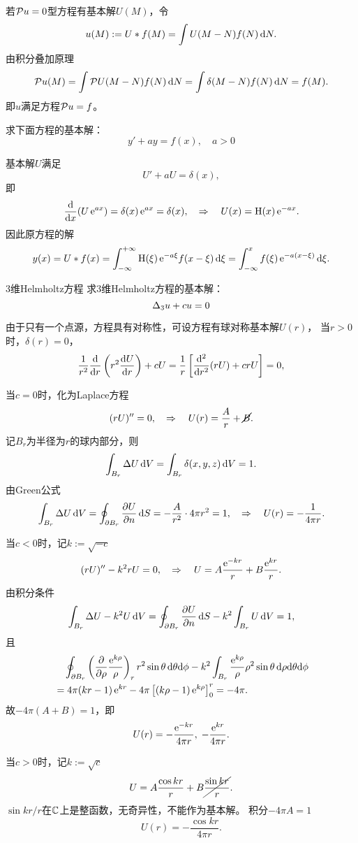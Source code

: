 若$\mathcal P u=0$型方程有基本解$U(M)$，令
\begin{align}
	u(M):=U\ast f(M)=\int U(M-N)f(N)\mathop{}\!\mathrm{d} N.
\end{align}
由积分叠加原理
\[
	\mathcal P u(M)=\int\mathcal P U(M-N)f(N)\mathop{}\!\mathrm{d} N=\int\delta(M-N)f(N)\mathop{}\!\mathrm{d} N=f(M).
\]
即$u$满足方程$\mathcal P u=f$。
\begin{example}{}{}
	求下面方程的基本解：
	\[
		y'+ay=f(x),\quad a>0
	\]
	
	基本解$U$满足
	\[
		U'+aU=\delta(x),
	\]
	即
	\[
		\dd x(U\e{ax})=\vd(x)\e{ax}=\delta(x),\thus U(x)=\Heaviside(x)\e{-ax}.
	\]
	因此原方程的解
	\[
		y(x)=U\ast f(x)=\int_{-\infty}^{+\infty}\operatorname{H}(\xi)\mathop{}\!\mathrm{e}^{-a\xi}f(x-\xi)\mathop{}\!\mathrm{d}\xi=\int_{-\infty}^xf(\xi)\mathop{}\!\mathrm{e}^{-a(x-\xi)}\mathop{}\!\mathrm{d}\xi.
	\]
\end{example}
\begin{example}{3维Helmholtz方程}{}
	求3维Helmholtz方程的基本解：
	\[
		\Delta_3 u+cu=0
	\]
	
	由于只有一个点源，方程具有对称性，可设方程有球对称基本解$U(r)$，
	当$r>0$时，$\delta(r)=0$，
	\[
		\frac1{r^2}\dd r\kh{r^2\dv Ur}+cU=\frac1r\fkh{\dd[2]r(rU)+crU}=0,
	\]
	
	当$c=0$时，化为Laplace方程
	\[
		(rU)''=0,\quad\Rightarrow\quad U(r)=\frac Ar+\cancel{B}.
	\]
	记$B_r$为半径为$r$的球内部分，则
	\[
		\int_{B_r}\Delta U\mathop{}\!\mathrm{d} V=\int_{B_r}\delta(x,y,z)\mathop{}\!\mathrm{d} V=1.
	\]
	由Green公式
	\[
		\int_{B_r}\Delta U\mathop{}\!\mathrm{d} V=\oint_{\partial B_r}\frac{\partial^{\;\!\!}U}{\partial n^{\;\!\!}}\mathop{}\!\mathrm{d} S=-\frac A{r^2}\cdot 4\pi r^2=1,\quad\Rightarrow\quad U(r)=-\frac1{4\pi r}.
	\]
	
	当$c<0$时，记$k:=\sqrt{-c}$
	\[
		(rU)''-k^2rU=0,\quad\Rightarrow\quad U=A\frac{\mathop{}\!\mathrm{e}^{-kr}}r+B\frac{\mathop{}\!\mathrm{e}^{kr}}r.
	\]
	由积分条件
	\[
		\int_{B_r}\Delta U-k^2U\mathop{}\!\mathrm{d} V=\oint_{\partial B_r}\frac{\partial^{\;\!\!}U}{\partial n^{\;\!\!}}\mathop{}\!\mathrm{d} S-k^2\int_{B_r}U\mathop{}\!\mathrm{d} V=1,
	\]
	且
	\begin{align*}
		&\quad\oint_{\p B_r}\kh{\pp\rho\frac{\e{k\rho}}\rho}_rr^2\sin\theta\d\theta\nd\phi-k^2\int_{B_r}\frac{\e{k\rho}}\rho\rho^2\sin\theta\d\rho\nd\theta\nd\phi\\
		&=4\pi(kr-1)\e{kr}-4\pi\fkh{(k\rho-1)\e{k\rho}}_0^r=-4\pi.
	\end{align*}
	故$-4\pi(A+B)=1$，即
	\[
		U(r)=-\frac{\mathop{}\!\mathrm{e}^{-kr}}{4\pi r},\;-\frac{\mathop{}\!\mathrm{e}^{kr}}{4\pi r}.
	\]
	
	当$c>0$时，记$k:=\sqrt c$
	\[
		U=A\frac{\cos kr}r+B\cancel{\frac{\sin kr}r}.
	\]
	$\sin kr/r$在$\mathbb C$上是整函数，无奇异性，不能作为基本解。
	积分$-4\pi A=1$
	\[
		U(r)=-\frac{\cos kr}{4\pi r}.
	\]
\end{example}
